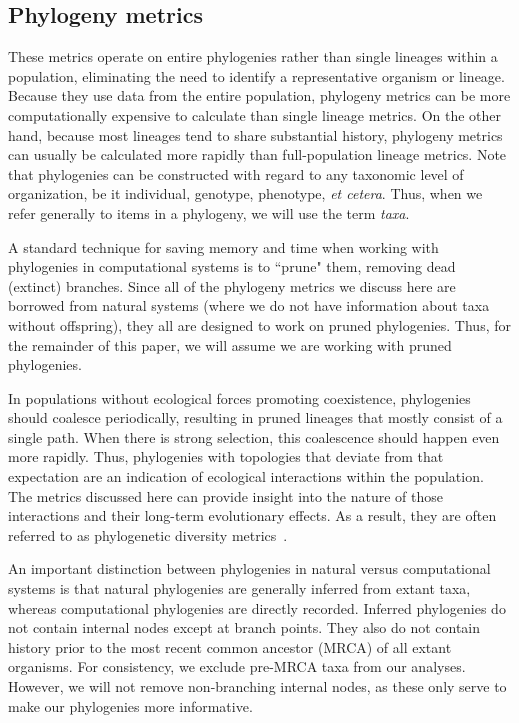 \documentclass[letterpaper]{article}
\begin{document}
\subsection{Phylogeny metrics}

These metrics operate on entire phylogenies rather than single lineages within a population, eliminating the need to identify a representative organism or lineage.
Because they use data from the entire population, phylogeny metrics can be more computationally expensive to calculate than single lineage metrics. On the other hand, because most lineages tend to share substantial history, phylogeny metrics can usually be calculated more rapidly than full-population lineage metrics. %
Note that phylogenies can be constructed with regard to any taxonomic level of organization, be it individual, genotype, phenotype, \textit{et cetera}. Thus, when we refer generally to items in a phylogeny, we will use the term \textit{taxa}.

A standard technique for saving memory and time when working with phylogenies in computational systems is to ``prune" them, removing 
dead (extinct) branches.
Since all of the phylogeny metrics we discuss here are borrowed from natural systems (where we do not have information about taxa without offspring), they all are designed to work on pruned phylogenies. Thus, for the remainder of this paper, we will assume we are working with pruned phylogenies.

In populations without ecological forces promoting coexistence, phylogenies should coalesce periodically, resulting in pruned lineages that mostly consist of a single path. When there is strong selection, this coalescence should happen even more rapidly. Thus, phylogenies with topologies that deviate from that expectation are an indication of ecological interactions within the population. The metrics discussed here can provide insight into the nature of those interactions and their long-term evolutionary effects. As a result, they are often referred to as phylogenetic diversity metrics~\citep{tucker_guide_2017}.

An important distinction between phylogenies in natural versus computational systems 
is that natural phylogenies are generally inferred from extant taxa, whereas computational phylogenies are directly recorded. %
Inferred phylogenies 
do not contain internal nodes except at branch points. They also do not contain history prior to the most recent common ancestor (MRCA) of all extant organisms. %
For consistency, we exclude pre-MRCA taxa from our analyses. However, we will not remove non-branching internal nodes, as these only serve to make our phylogenies more informative.
\end{document}
